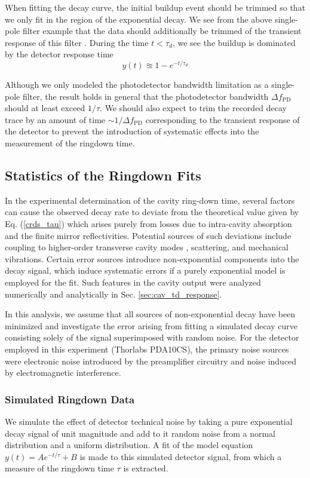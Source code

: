 \documentclass[12pt]{report}
\begin{document}
	When fitting the decay curve, the initial buildup event should be trimmed so that we only fit in the region of the exponential decay. We see from the above single-pole filter example that the data should additionally be trimmed of the transient response of this filter \cite{frontiers_mol_spec}. During the time $t<\tau_d$, we see the buildup is dominated by the detector response time
	\begin{equation}
		y(t) \approxeq 1- e^{-t/\tau_d}
	\end{equation}
	
	Although we only modeled the photodetector bandwidth limitation as a single-pole filter, the result holds in general that the photodetector bandwidth $\Delta f_\mathrm{PD}$ should at least exceed $1/\tau$. We should also expect to trim the recorded decay trace by an amount of time $\sim 1/\Delta f_\mathrm{PD}$ corresponding to the transient response of the detector to prevent the introduction of systematic effects into the measurement of the ringdown time.
	
	\subsection{Statistics of the Ringdown Fits}
	In the experimental determination of the cavity ring-down time, several factors can cause the observed decay rate to deviate from the theoretical value given by Eq. (\ref{crds_tau}) which arises purely from losses due to intra-cavity absorption and the finite mirror reflectivities. Potential sources of such deviations include coupling to higher-order transverse cavity modes \cite{crds_noise_higherOrderModes}, scattering, and mechanical vibrations. Certain error sources introduce non-exponential components into the decay signal, which induce systematic errors if a purely exponential model is employed for the fit. Such features in the cavity output were analyzed numerically and analytically in Sec. \ref{sec:cav_td_response}.
	
	In this analysis, we assume that all sources of non-exponential decay have been minimized and investigate the error arising from fitting a simulated decay curve consisting solely of the signal superimposed with random noise. For the detector employed in this experiment (Thorlabs PDA10CS), the primary noise sources were electronic noise introduced by the preamplifier circuitry and noise induced by electromagnetic interference.
	
	\subsubsection{Simulated Ringdown Data}	
	We simulate the effect of detector technical noise by taking a pure exponential decay signal of unit magnitude and add to it random noise from a normal distribution and a uniform distribution. A fit of the model equation $y(t) = Ae^{-t/\tau} + B$ is made to this simulated detector signal, from which a measure of the ringdown time $\tau$ is extracted.
	
\end{document}
